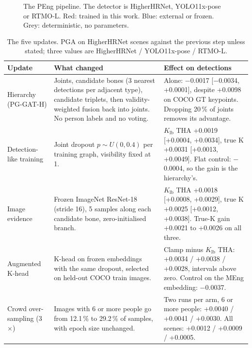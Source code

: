 \documentclass[11pt,a4paper]{article}
\newcommand{\Klb}{K_{\mathrm{lb}}}
\begin{document}
\begin{figure}[H]
{%
}
\caption{The PEng pipeline. The detector is HigherHRNet, YOLO11x-pose or RTMO-L.
Red: trained in this work. Blue: external or frozen. Grey: deterministic, no parameters.}
\label{fig:pipeline}
\end{figure}

\begin{table}[H]
\centering
\caption{The five updates. PGA on HigherHRNet scenes against the previous step unless stated;
three values are HigherHRNet / YOLO11x-pose / RTMO-L.}
\label{tab:updates}
\begin{tabularx}{\linewidth}{@{}P{2.3cm}LL@{}}
\toprule
Update & What changed & Effect on detections \\
\midrule
Hierarchy (PG-GAT-H)
& Joints, candidate bones (3 nearest detections per adjacent type), candidate triplets,
then validity-weighted fusion back into joints.
No person labels and no voting.
& Alone: $-$0.0017 [$-$0.0034, +0.0001], despite +0.0098 on COCO GT keypoints.
Dropping 20\,\% of joints removes its advantage. \\
\addlinespace
Detection-like training
& Joint dropout $p \sim U(0, 0.4)$ per training graph, visibility fixed at 1.
& $\Klb$ THA +0.0019 [+0.0004, +0.0034], true K +0.0031 [+0.0013, +0.0049].
Flat control: $-$0.0004, so the gain is the hierarchy's. \\
\addlinespace
Image evidence
& Frozen ImageNet ResNet-18 (stride 16), 5 samples along each candidate bone, zero-initialised branch.
& $\Klb$ THA +0.0018 [+0.0008, +0.0029], true K +0.0025 [+0.0012, +0.0038].
True-K gain +0.0021 to +0.0026 on all three. \\
\addlinespace
Augmented K-head
& K-head on frozen embeddings with the same dropout, selected on held-out COCO train images.
& Clamp minus $\Klb$ THA: +0.0034 / +0.0038 / +0.0028, intervals above zero.
Control on the MEng embedding: $-$0.0037. \\
\addlinespace
Crowd over-sampling (3$\times$)
& Images with 6 or more people go from 12.1\,\% to 29.2\,\% of samples, with epoch size unchanged.
& Two runs per arm, 6 or more people: +0.0040 / +0.0041 / +0.0030.
All scenes: +0.0012 / +0.0009 / +0.0005. \\
\bottomrule
\end{tabularx}
\end{table}
\end{document}

